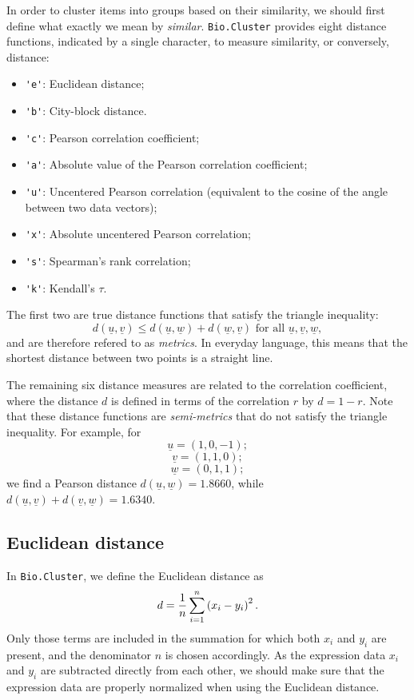 \documentclass{report}
\begin{document}
In order to cluster items into groups based on their similarity, we should first define what exactly we mean by \emph{similar}. \verb|Bio.Cluster| provides eight distance functions, indicated by a single character, to measure similarity, or conversely, distance:
\begin{itemize}
\item \verb|'e'|:
Euclidean distance;
\item \verb|'b'|:
City-block distance.
\item \verb|'c'|:
Pearson correlation coefficient;
\item \verb|'a'|:
Absolute value of the Pearson correlation coefficient;
\item \verb|'u'|:
Uncentered Pearson correlation (equivalent to the cosine of the angle between two data vectors);
\item \verb|'x'|:
Absolute uncentered Pearson correlation;
\item \verb|'s'|:
Spearman's rank correlation;
\item \verb|'k'|:
Kendall's $\tau$.
\end{itemize}
The first two are true distance functions that satisfy the triangle inequality:
$$d\left(\underline{u},\underline{v}\right) \leq d\left(\underline{u},\underline{w}\right) + d\left(\underline{w},\underline{v}\right) \textrm{ for all } \underline{u}, \underline{v}, \underline{w},$$
and are therefore refered to as \emph{metrics}. In everyday language, this means that the shortest distance between two points is a straight line.

The remaining six distance measures are related to the correlation coefficient, where the distance $d$ is defined in terms of the correlation $r$ by $d=1-r$.  Note that these distance functions are \emph{semi-metrics} that do not satisfy the triangle inequality. For example, for
$$\underline{u}=\left(1,0,-1\right);$$
$$\underline{v}=\left(1,1,0\right);$$
$$\underline{w}=\left(0,1,1\right);$$
we find a Pearson distance
$d\left(\underline{u},\underline{w}\right) = 1.8660$, while
$d\left(\underline{u},\underline{v}\right)+d\left(\underline{v},\underline{w}\right) = 1.6340$.

\subsection*{Euclidean distance}

In \verb|Bio.Cluster|, we define the Euclidean distance as
$$d = {1 \over n} \sum_{i=1}^{n} \left(x_i-y_i\right)^{2}.$$
Only those terms are included in the summation for which both
$x_i$ and $y_i$ are present, and the denominator $n$ is chosen accordingly.
As the expression data $x_i$ and $y_i$ are subtracted directly from each other, we should make sure that the expression data are properly normalized when using the Euclidean distance.
\end{document}
